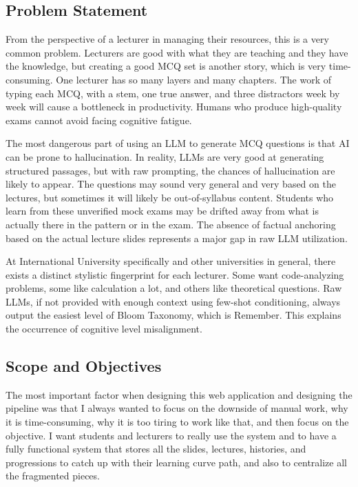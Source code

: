 \documentclass[12pt,a4paper]{article}
\begin{document}
\subsection{Problem Statement}

From the perspective of a lecturer in managing their resources, this is a
very common problem. Lecturers are good with what they are teaching and they
have the knowledge, but creating a good MCQ set is another story, which is
very time-consuming. One lecturer has so many layers and many chapters. The
work of typing each MCQ, with a stem, one true answer, and three distractors
week by week will cause a bottleneck in productivity. Humans who produce
high-quality exams cannot avoid facing cognitive fatigue.

The most dangerous part of using an LLM to generate MCQ questions is that AI
can be prone to hallucination. In reality, LLMs are very good at generating
structured passages, but with raw prompting, the chances of hallucination are
likely to appear. The questions may sound very general and very based on the
lectures, but sometimes it will likely be out-of-syllabus content. Students
who learn from these unverified mock exams may be drifted away from what is
actually there in the pattern or in the exam. The absence of factual
anchoring based on the actual lecture slides represents a major gap in raw
LLM utilization.

At International University specifically and other universities in general,
there exists a distinct stylistic fingerprint for each lecturer. Some want
code-analyzing problems, some like calculation a lot, and others like
theoretical questions. Raw LLMs, if not provided with enough context using
few-shot conditioning, always output the easiest level of Bloom Taxonomy,
which is Remember. This explains the occurrence of cognitive level
misalignment.

\subsection{Scope and Objectives}

The most important factor when designing this web application and designing
the pipeline was that I always wanted to focus on the downside of manual
work, why it is time-consuming, why it is too tiring to work like that, and
then focus on the objective. I want students and lecturers to really use the
system and to have a fully functional system that stores all the slides,
lectures, histories, and progressions to catch up with their learning curve
path, and also to centralize all the fragmented pieces.
\end{document}
